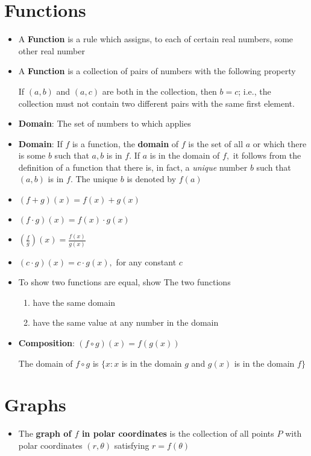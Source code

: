 \documentclass{report}
\begin{document}
  \chapter{Functions}%
    \begin{itemize}
      \item A \textbf{Function} is a rule which assigns, to each of certain
        real numbers, some other real number
      \item A \textbf{Function} is a collection  of pairs of numbers with the
        following property

        If $(a,b)$ and $(a,c)$ are both in the collection, then $b=c$; 
        i.e., the collection must not contain two different pairs with the
        same first element.
      \item \textbf{Domain}: The set of numbers to which  applies
      \item \textbf{Domain}: If $f$ is a function, the \textbf{domain} of $f$
        is the set of all $a$ or which there is some $b$ such that $a,b$
        is in $f$.  If $a$ is in the domain of $f,$ it follows from the
        definition of a function that there is, in fact, a \textit{unique}
        number $b$ such that $(a,b)$ is in $f$.  The unique $b$ is denoted
        by $f (a)$
      \item $(f + g) (x) = f (x) + g (x)$
      \item $(f \cdot g) (x) = f (x) \cdot g (x)$
      \item $(\frac{f}{g}) (x) = \frac{f (x)}{g (x)}$
      \item $(c \cdot g) (x) = c \cdot g (x),$ for any constant $c$
      \item To show two functions are equal, show The two functions 
        \begin{enumerate}
          \item have the same domain
          \item have the same value at any number in the domain
        \end{enumerate}
      \item \textbf{Composition}: $(f \circ g) (x) = f (g (x))$

          The domain of $f \circ g$ is $\{x : x$ is in the domain $g$
          and $g (x)$ is in the domain $f\}$
    \end{itemize}

  \chapter{Graphs}%
    \begin{itemize}
      \item The \textbf{graph of $f$ in polar coordinates} is the collection
        of all points $P$ with polar coordinates $ (r, \theta)$ satisfying
        $r = f (\theta)$
    \end{itemize}
\end{document}
